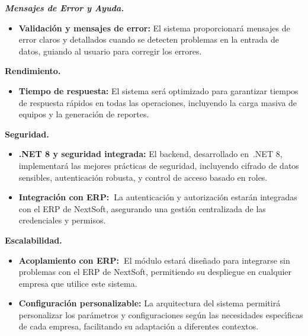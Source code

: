\documentclass[stu, 12pt, letterpaper, donotrepeattitle, floatsintext, natbib]{apa7}
\begin{document}
\textit{\textbf{Mensajes de Error y Ayuda.}}
\begin{itemize}
    \item\textbf{Validaci\'on y mensajes de error: }El sistema proporcionar\'a mensajes de error claros y detallados cuando se detecten problemas en la entrada de datos, guiando al usuario para corregir los errores.
\end{itemize}

\textbf{Rendimiento.}
\begin{itemize}
    \item\textbf{Tiempo de respuesta: }El sistema ser\'a optimizado para garantizar tiempos de respuesta r\'apidos en todas las operaciones, incluyendo la carga masiva de equipos y la generaci\'on de reportes.
\end{itemize}

\textbf{Seguridad.}
\begin{itemize}
    \item\textbf{.NET 8 y seguridad integrada: }El backend, desarrollado en~.NET 8, implementar\'a las mejores pr\'acticas de seguridad, incluyendo cifrado de datos sensibles, autenticaci\'on robusta, y control de acceso basado en roles.
    \item\textbf{Integraci\'on con ERP:~}La autenticaci\'on y autorizaci\'on estar\'an integradas con el ERP de NextSoft, asegurando una gesti\'on centralizada de las credenciales y permisos.
\end{itemize}

\textbf{Escalabilidad.}
\begin{itemize}
    \item\textbf{Acoplamiento con ERP:~}El m\'odulo estar\'a dise\~{n}ado para integrarse sin problemas con el ERP de NextSoft, permitiendo su despliegue en cualquier empresa que utilice este sistema.
    \item\textbf{Configuraci\'on personalizable: }La arquitectura del sistema permitir\'a personalizar los par\'ametros y configuraciones seg\'un las necesidades espec\'{\i}ficas de cada empresa, facilitando su adaptaci\'on a diferentes contextos.
\end{itemize}
\end{document}
